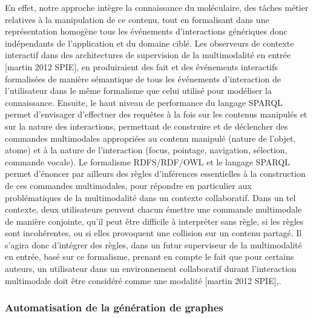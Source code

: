 En effet, notre approche intègre la connaissance du moléculaire, des tâches métier relatives à la manipulation de ce contenu, tout en formalisant dans une représentation homogène tous les événements d'interactions génériques donc indépendants de l'application et du domaine ciblé. Les observeurs de contexte interactif dans des architectures de supervision de la multimodalité en entrée [martin 2012 SPIE], en produiraient des fait et des événements interactifs formalisées de manière sémantique de tous les événements d'interaction de l'utilisateur dans le même formalisme que celui utilisé pour modéliser la connaissance. Ensuite, le haut niveau de performance du langage SPARQL permet d'envisager d'effectuer des requêtes à la fois sur les contenus manipulés et sur la nature des interactions, permettant de construire et de déclencher des commandes multimodales appropriées au contenu manipulé (nature de l'objet, atome) et à la nature de l'interaction (focus, pointage, navigation, sélection, commande vocale). Le formalisme RDFS/RDF/OWL et le langage SPARQL permet d'énoncer par ailleurs des règles d'inférences essentielles à la construction de ces commandes multimodales, pour répondre en particulier aux problématiques de la multimodalité dans un contexte collaboratif. 
Dans un tel contexte, deux utilisateurs peuvent chacun émettre une commande multimodale de manière conjointe, qu'il peut être difficile à interpréter sans règle, si les règles sont incohérentes, ou si elles provoquent une collision sur un contenu partagé. Il s'agira donc d'intégrer des règles, dans un futur superviseur de la multimodalité en entrée, basé sur ce formalisme, prenant en compte le fait que pour certains auteurs, un utilisateur dans un environnement collaboratif durant l'interaction multimodale doit être considéré comme une modalité [martin 2012 SPIE],.



\subsubsection*{Automatisation de la génération de graphes}

